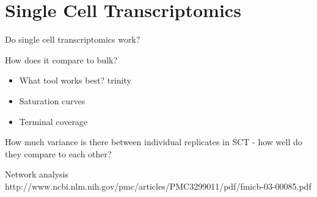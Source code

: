 \graphicspath{{chapters/5.Chapter_3/figures}}

\chapter{Single Cell Transcriptomics}

Do single cell transcriptomics work?

How does it compare to bulk? 
\begin{itemize}
    \item What tool works best? trinity
    \item Saturation curves
    \item Terminal coverage
\end{itemize}

How much variance is there between individual replicates in SCT - how well do they compare to each other?



Network analysis
http://www.ncbi.nlm.nih.gov/pmc/articles/PMC3299011/pdf/fmicb-03-00085.pdf





